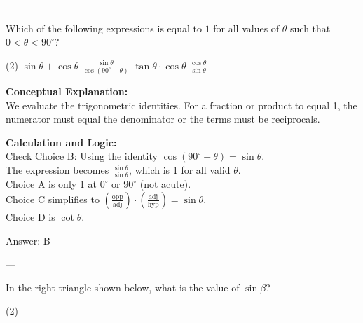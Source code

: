 \documentclass[11pt,paper=a4,answers]{exam}
\begin{document}
\begin{questions}
---

\question
Which of the following expressions is equal to $1$ for all values of $\theta$ such that $0 < \theta < 90^\circ$?
\begin{tasks}(2)
    \task $\sin \theta + \cos \theta$
    \task $\frac{\sin \theta}{\cos(90^\circ - \theta)}$
    \task $\tan \theta \cdot \cos \theta$
    \task $\frac{\cos \theta}{\sin \theta}$
\end{tasks}

\begin{solution}
\textbf{Conceptual Explanation:} \\
We evaluate the trigonometric identities. For a fraction or product to equal 1, the numerator must equal the denominator or the terms must be reciprocals.

\vspace{10pt}
\textbf{Calculation and Logic:} \\
Check Choice B: Using the identity $\cos(90^\circ - \theta) = \sin \theta$. \\
The expression becomes $\frac{\sin \theta}{\sin \theta}$, which is 1 for all valid $\theta$. \\
Choice A is only 1 at $0^\circ$ or $90^\circ$ (not acute). \\
Choice C simplifies to $(\frac{\text{opp}}{\text{adj}}) \cdot (\frac{\text{adj}}{\text{hyp}}) = \sin \theta$. \\
Choice D is $\cot \theta$.

\vspace{15pt}
Answer: \colorbox{yellow!100}{B}
\end{solution}

---

\question
In the right triangle shown below, what is the value of $\sin \beta$?
\begin{center}
\end{center}
\begin{tasks}(2)
\end{tasks}


\end{questions}
\end{document}
